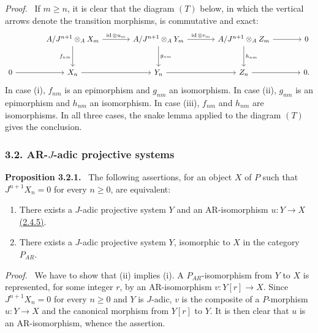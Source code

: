 \documentclass[11pt]{article}
\newenvironment{statement}[1]{\par\medskip\noindent\textbf{#1.}\ }{\par\medskip}
\newenvironment{prooftext}[1][Proof]{\par\noindent\emph{#1.}\ }{\par\medskip}
\providecommand{\id}{\operatorname{id}}
\providecommand{\id}{\operatorname{id}}
\providecommand{\id}{\operatorname{id}}
\providecommand{\id}{\operatorname{id}}
\providecommand{\id}{\operatorname{id}}
\providecommand{\id}{\operatorname{id}}
\begin{document}
\begin{prooftext}[Proof]
If $m\ge n$, it is clear that the diagram $(T)$ below, in which the vertical arrows denote the transition morphisms, is commutative and exact:
\[
\begin{tikzcd}[column sep=large,row sep=large]
{} & A/J^{n+1}\otimes_A X_m \arrow[r,"\id\otimes u_m"] \arrow[d,"f_{nm}"'] & A/J^{n+1}\otimes_A Y_m \arrow[r,"\id\otimes v_m"] \arrow[d,"g_{nm}"] & A/J^{n+1}\otimes_A Z_m \arrow[r] \arrow[d,"h_{nm}"] & 0\\
0 \arrow[r] & X_n \arrow[r] & Y_n \arrow[r] & Z_n \arrow[r] & 0 .
\end{tikzcd}
\]
In case (i), $f_{nm}$ is an epimorphism and $g_{nm}$ an isomorphism. In case (ii), $g_{nm}$ is an epimorphism and $h_{nm}$ an isomorphism. In case (iii), $f_{nm}$ and $h_{nm}$ are isomorphisms. In all three cases, the snake lemma applied to the diagram $(T)$ gives the conclusion.
\end{prooftext}

\subsubsection*{3.2. AR-$J$-adic projective systems}\label{sga5:V:subsubsection:3.2}
\label{sga5:V:proposition:3.2.1}\begin{statement}{Proposition 3.2.1}
The following assertions, for an object $X$ of $P$ such that $J^{n+1}X_n=0$ for every $n\ge0$, are equivalent:
\begin{enumerate}[label=(\roman*)]
\item There exists a $J$-adic projective system $Y$ and an AR-isomorphism $u:Y\to X$ \hyperref[sga5:V:corollary:2.4.5]{(2.4.5)}.
\item There exists a $J$-adic projective system $Y$, isomorphic to $X$ in the category $P_{AR}$.
\end{enumerate}
\end{statement}

\begin{prooftext}[Proof]
We have to show that (ii) implies (i). A $P_{AR}$-isomorphism from $Y$ to $X$ is represented, for some integer $r$, by an AR-isomorphism $v:Y[r]\to X$. Since $J^{n+1}X_n=0$ for every $n\ge0$ and $Y$ is $J$-adic, $v$ is the composite of a $P$-morphism $u:Y\to X$ and the canonical morphism from $Y[r]$ to $Y$. It is then clear that $u$ is an AR-isomorphism, whence the assertion.
\end{prooftext}
\end{document}
